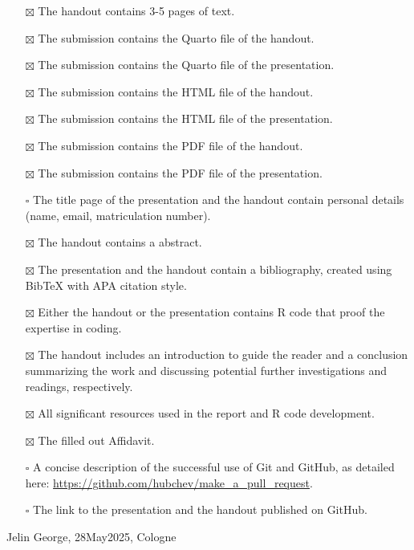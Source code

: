 \documentclass[
  man,
  floatsintext,
  longtable,
  nolmodern,
  notxfonts,
  notimes,
  colorlinks=true,linkcolor=blue,citecolor=blue,urlcolor=blue]{apa7}
\providecommand{\tightlist}{%
  \setlength{\itemsep}{0pt}\setlength{\parskip}{0pt}}
\begin{document}
\begin{itemize}
\tightlist
\item[$\boxtimes$]
  The handout contains 3-5 pages of text.
\item[$\boxtimes$]
  The submission contains the Quarto file of the handout.
\item[$\boxtimes$]
  The submission contains the Quarto file of the presentation.
\item[$\boxtimes$]
  The submission contains the HTML file of the handout.
\item[$\boxtimes$]
  The submission contains the HTML file of the presentation.
\item[$\boxtimes$]
  The submission contains the PDF file of the handout.
\item[$\boxtimes$]
  The submission contains the PDF file of the presentation.
\item[$\square$]
  The title page of the presentation and the handout contain personal
  details (name, email, matriculation number).
\item[$\boxtimes$]
  The handout contains a abstract.
\item[$\boxtimes$]
  The presentation and the handout contain a bibliography, created using
  BibTeX with APA citation style.
\item[$\boxtimes$]
  Either the handout or the presentation contains R code that proof the
  expertise in coding.
\item[$\boxtimes$]
  The handout includes an introduction to guide the reader and a
  conclusion summarizing the work and discussing potential further
  investigations and readings, respectively.
\item[$\boxtimes$]
  All significant resources used in the report and R code development.
\item[$\boxtimes$]
  The filled out Affidavit.
\item[$\square$]
  A concise description of the successful use of Git and GitHub, as
  detailed here: \url{https://github.com/hubchev/make_a_pull_request}.
\item[$\square$]
  The link to the presentation and the handout published on GitHub.
\end{itemize}

Jelin George, 28May2025, Cologne
\end{document}
